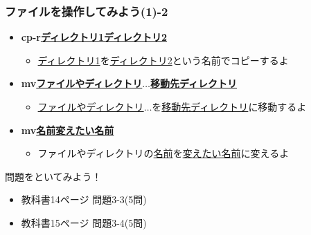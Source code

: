 \begin{frame}
    \frametitle{ファイルを操作してみよう(1)-2}
    \begin{itemize}
        \item {\bf cp\textvisiblespace-r\textvisiblespace\underline{ディレクトリ1}\textvisiblespace\underline{ディレクトリ2}}
        \begin{itemize}
            \small
            \item[] \underline{ディレクトリ1}を\underline{ディレクトリ2}という名前でコピーするよ
        \end{itemize}
            \item {\bf mv\textvisiblespace\underline{ファイルやディレクトリ}$\ldots$\textvisiblespace\underline{移動先ディレクトリ}}
        \begin{itemize}
            \small
            \item[] \underline{ファイルやディレクトリ}$\ldots$を\underline{移動先ディレクトリ}に移動するよ
        \end{itemize}
        \item {\bf mv\textvisiblespace\underline{名前}\textvisiblespace\underline{変えたい名前}}
        \begin{itemize}
            \small
            \item[] ファイルやディレクトリの\underline{名前}を\underline{変えたい名前}に変えるよ
        \end{itemize}
    \end{itemize}
\end{frame}

\begin{frame}
    \begin{exampleblock}{問題をといてみよう！}
        \begin{itemize}
            \item 教科書14ページ 問題3-3(5問)
            \item 教科書15ページ 問題3-4(5問)
            \end{itemize}
    \end{exampleblock} 
\end{frame}

